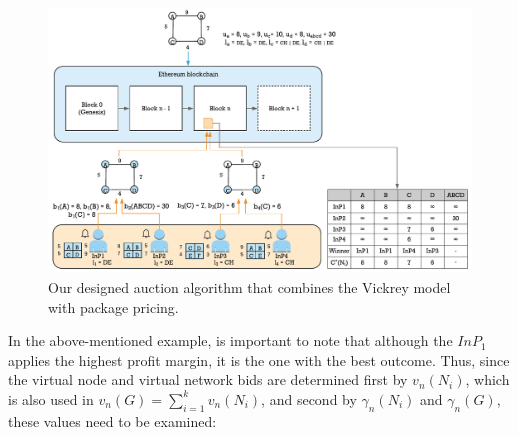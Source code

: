 \begin{figure}[bth]
	\centering
	\includegraphics[scale=0.75]{gfx/vickrey}    
  	\caption{Our designed auction algorithm that combines the Vickrey model with package pricing.}
  	\label{fig:vickrey}
\end{figure}

In the above-mentioned example, is important to note that although the $InP_1$ applies the highest profit margin, it is the one with the best outcome. Thus, since the virtual node and virtual network bids are determined first by $v_n(N_i)$, which is also used in $v_n(G) = \sum_{i=1}^{k} v_n(N_i)$, and second by $\gamma_n(N_i)$ and $\gamma_n(G)$, these values need to be examined:

